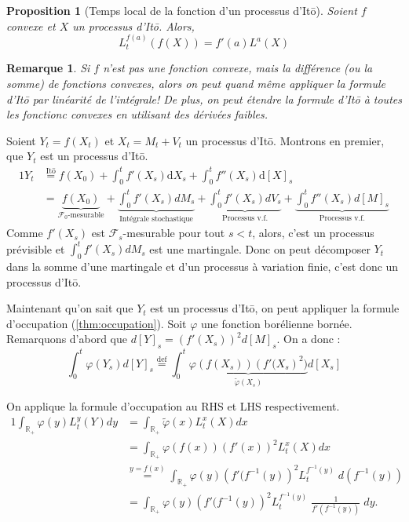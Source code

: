 \documentclass[openany]{book}
\makeatletter
\newcommand{\F}{\mathscr{F}}
\newcommand{\R}{\mathbb{R}}
\newcommand{\1}{\mathbbm{1}}
\renewcommand{\d}{\mathrm{d}}
\renewenvironment{proof}[1][\textbf{\textit{Démonstration}}]{%
  \par\pushQED{\qed}%
  \normalfont\topsep6\p@\@plus6\p@\relax
  \trivlist\item[\hskip\labelsep
    #1\@addpunct{.}]\ignorespaces
}{%
  \popQED\endtrivlist\@endpefalse
}
\theoremstyle{thmfont}
\theoremstyle{deffont}
\theoremstyle{thmfont}
\newtheorem{prop}[prop]{Proposition}
\theoremstyle{deffont}
\newtheorem{remark}[remark]{Remarque}
\makeatother
\begin{document}
\begin{prop}[Temps local de la fonction d'un processus d'Itō]
  Soient $f$ convexe et $X$ un processus d'Itō. Alors,
  $$L_t^{f(a)}(f(X)) = f'(a) L^a(X)$$
\end{prop}

\begin{remark}
  Si $f$ n'est pas une fonction convexe, mais la différence (ou la somme) de fonctions convexes, alors on peut quand même appliquer la formule d'Itō par linéarité de l'intégrale! De plus, on peut étendre la formule d'Itō à toutes les fonctionc convexes en utilisant des dérivées faibles.
\end{remark}

\begin{proof}
  Soient $Y_t = f(X_t)$ et $X_t = M_t + V_t$ un processus d'Itō. Montrons en premier, que $Y_t$ est un processus d'Itō. 
  \begin{alignat*}{1}
    Y_t &\overset{\text{Itō}}{=} f(X_0) + \int_0^t f'(X_s) \d X_s + \int_0^t f''(X_s) \d [X]_s\\
        &= \underbrace{f(X_0)}_{\F_0\text{-mesurable}} + \underbrace{\int_0^t f'(X_s) dM_s}_{\text{Intégrale stochastique}} + \underbrace{\int_0^t f'(X_s) dV_s}_{\text{Processus v.f.}} + \underbrace{\int_0^t f''(X_s) d[M]_s}_{\text{Processus v.f.}}
  \end{alignat*}
  Comme $f'(X_s)$ est $\F_s$-mesurable pour tout $s<t$, alors, c'est un processus prévisible et $\int_0^t f'(X_s) dM_s$ est une martingale.
  Donc on peut décomposer $Y_t$ dans la somme d'une martingale et d'un processus à variation finie, c'est donc un processus d'Itō.


  
Maintenant qu'on sait que $Y_t$ est un processus d'Itō, on peut appliquer la formule d'occupation (\autoref{thm:occupation}). Soit $\varphi$ une fonction borélienne bornée. Remarquons d'abord que $d[Y]_s = \left(f'(X_s)\right)^2 d[M]_s$. On a donc :
$$  \int_0^t \varphi(Y_s) d[Y]_s \overset{\text{def}}{=} \int_0^t \underbrace{\varphi(f(X_s)) \left(f'(X_s\right)^2)}_{\tilde\varphi(X_s)} d[X_s]
$$

On applique la formule d'occupation au RHS et LHS respectivement.
\begin{alignat*}{1}
\int_{\R_+} \varphi(y) L_t^y(Y) dy &= \int_{\R_+} \tilde\varphi(x) L_t^x(X) dx\\
                         &= \int_{\R_+}\varphi(f(x)) \left(f'(x)\right)^2 L_t^x(X) dx\\
                       &\overset{y = f(x)}{=} \int_{\R_+}\varphi(y) \left(f'(f^{-1}(y)\right)^2 L_t^{f^{-1}(y)}\;d\left(f^{-1}(y)\right) \\
  &=  \int_{\R_+}\varphi(y) \left(f' (f^{-1}(y)\right)^2 L_t^{f^{-1}(y)} \;\frac{1}{f'\left(f^{-1}(y)\right)} \;dy.
\end{alignat*}


\end{proof}
\end{document}

